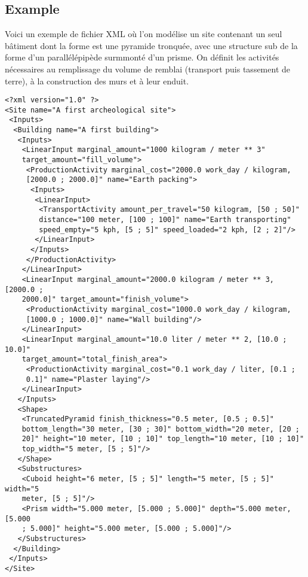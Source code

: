 \documentclass{article}
\begin{document}
\subsection{Example}
Voici un exemple de fichier XML où l'on modélise un site contenant un seul bâtiment dont la forme est une pyramide tronquée, avec une structure sub de la forme d'un parallélépipède surmmonté d'un prisme. On définit les activités nécessaires au remplissage du volume de remblai (transport puis tassement de terre), à la construction des murs et à leur enduit.

\begin{verbatim}
<?xml version="1.0" ?>
<Site name="A first archeological site">
 <Inputs>
  <Building name="A first building">
   <Inputs>
    <LinearInput marginal_amount="1000 kilogram / meter ** 3" 
    target_amount="fill_volume">
     <ProductionActivity marginal_cost="2000.0 work_day / kilogram, 
     [2000.0 ; 2000.0]" name="Earth packing">
      <Inputs>
       <LinearInput>
        <TransportActivity amount_per_travel="50 kilogram, [50 ; 50]" 
        distance="100 meter, [100 ; 100]" name="Earth transporting" 
        speed_empty="5 kph, [5 ; 5]" speed_loaded="2 kph, [2 ; 2]"/>
       </LinearInput>
      </Inputs>
     </ProductionActivity>
    </LinearInput>
    <LinearInput marginal_amount="2000.0 kilogram / meter ** 3, [2000.0 ; 
    2000.0]" target_amount="finish_volume">
     <ProductionActivity marginal_cost="1000.0 work_day / kilogram, 
     [1000.0 ; 1000.0]" name="Wall building"/>
    </LinearInput>
    <LinearInput marginal_amount="10.0 liter / meter ** 2, [10.0 ; 10.0]" 
    target_amount="total_finish_area">
     <ProductionActivity marginal_cost="0.1 work_day / liter, [0.1 ; 
     0.1]" name="Plaster laying"/>
    </LinearInput>
   </Inputs>
   <Shape>
    <TruncatedPyramid finish_thickness="0.5 meter, [0.5 ; 0.5]" 
    bottom_length="30 meter, [30 ; 30]" bottom_width="20 meter, [20 ; 
    20]" height="10 meter, [10 ; 10]" top_length="10 meter, [10 ; 10]" 
    top_width="5 meter, [5 ; 5]"/>
   </Shape>
   <Substructures>
    <Cuboid height="6 meter, [5 ; 5]" length="5 meter, [5 ; 5]" width="5 
    meter, [5 ; 5]"/>
    <Prism width="5.000 meter, [5.000 ; 5.000]" depth="5.000 meter, [5.000 
    ; 5.000]" height="5.000 meter, [5.000 ; 5.000]"/>
   </Substructures>
  </Building>
 </Inputs>
</Site>
\end{verbatim}
\end{document}
